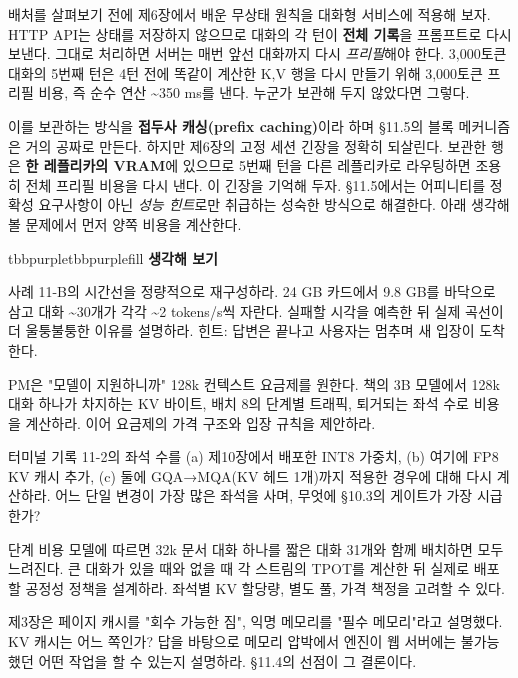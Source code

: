 배처를 살펴보기 전에 제6장에서 배운 무상태 원칙을 대화형 서비스에 적용해 보자. HTTP API는 상태를 저장하지 않으므로 대화의 각 턴이 \textbf{전체 기록}을 프롬프트로 다시 보낸다. 그대로 처리하면 서버는 매번 앞선 대화까지 다시 \textit{프리필}해야 한다. 3,000토큰 대화의 5번째 턴은 4턴 전에 똑같이 계산한 K,V 행을 다시 만들기 위해 3,000토큰 프리필 비용, 즉 순수 연산 \textasciitilde{}350 ms를 낸다. 누군가 보관해 두지 않았다면 그렇다.

이를 보관하는 방식을 \textbf{접두사 캐싱(prefix caching)}이라 하며 §11.5의 블록 메커니즘은 거의 공짜로 만든다. 하지만 제6장의 고정 세션 긴장을 정확히 되살린다. 보관한 행은 \textbf{한 레플리카의 VRAM}에 있으므로 5번째 턴을 다른 레플리카로 라우팅하면 조용히 전체 프리필 비용을 다시 낸다. 이 긴장을 기억해 두자. §11.5에서는 어피니티를 정확성 요구사항이 아닌 \textit{성능 힌트}로만 취급하는 성숙한 방식으로 해결한다. 아래 생각해 볼 문제에서 먼저 양쪽 비용을 계산한다.

\begin{calloutbox}{tbbpurple}{tbbpurplefill}
{\normalsize\bfseries\color{tbbpurple}생각해 보기}\par\vspace{3pt}
\begin{tbbitemize}
  \item 사례 11-B의 시간선을 정량적으로 재구성하라. 24 GB 카드에서 9.8 GB를 바닥으로 삼고 대화 \textasciitilde{}30개가 각각 \textasciitilde{}2 tokens/s씩 자란다. 실패할 시각을 예측한 뒤 실제 곡선이 더 울퉁불퉁한 이유를 설명하라. 힌트: 답변은 끝나고 사용자는 멈추며 새 입장이 도착한다.
  \item PM은 "모델이 지원하니까" 128k 컨텍스트 요금제를 원한다. 책의 3B 모델에서 128k 대화 하나가 차지하는 KV 바이트, 배치 8의 단계별 트래픽, 퇴거되는 좌석 수로 비용을 계산하라. 이어 요금제의 가격 구조와 입장 규칙을 제안하라.
  \item 터미널 기록 11-2의 좌석 수를 (a) 제10장에서 배포한 INT8 가중치, (b) 여기에 FP8 KV 캐시 추가, (c) 둘에 GQA→MQA(KV 헤드 1개)까지 적용한 경우에 대해 다시 계산하라. 어느 단일 변경이 가장 많은 좌석을 사며, 무엇에 §10.3의 게이트가 가장 시급한가?
  \item 단계 비용 모델에 따르면 32k 문서 대화 하나를 짧은 대화 31개와 함께 배치하면 모두 느려진다. 큰 대화가 있을 때와 없을 때 각 스트림의 TPOT를 계산한 뒤 실제로 배포할 공정성 정책을 설계하라. 좌석별 KV 할당량, 별도 풀, 가격 책정을 고려할 수 있다.
  \item 제3장은 페이지 캐시를 "회수 가능한 짐", 익명 메모리를 "필수 메모리"라고 설명했다. KV 캐시는 어느 쪽인가? 답을 바탕으로 메모리 압박에서 엔진이 웹 서버에는 불가능했던 어떤 작업을 할 수 있는지 설명하라. §11.4의 선점이 그 결론이다.
\end{tbbitemize}
\end{calloutbox}

